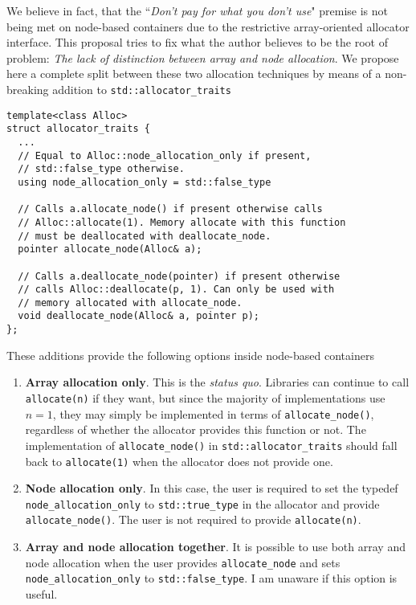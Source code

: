 \documentclass[11pt]{article}
\begin{document}
We believe in fact, that the ``{\it Don't pay for what you don't use}" premise
is not being met on node-based containers due to the restrictive
array-oriented allocator interface. This proposal tries to fix what the author
believes to be the root of problem: {\it The lack of distinction between array
and node allocation}.  We propose here a complete split between these two
allocation techniques by means of a non-breaking addition to
\texttt{std::allocator\_traits}
\medskip
\begin{lstlisting}
template<class Alloc>
struct allocator_traits {
  ...
  // Equal to Alloc::node_allocation_only if present,
  // std::false_type otherwise.
  using node_allocation_only = std::false_type

  // Calls a.allocate_node() if present otherwise calls
  // Alloc::allocate(1). Memory allocate with this function
  // must be deallocated with deallocate_node.
  pointer allocate_node(Alloc& a);

  // Calls a.deallocate_node(pointer) if present otherwise
  // calls Alloc::deallocate(p, 1). Can only be used with
  // memory allocated with allocate_node.
  void deallocate_node(Alloc& a, pointer p);
};
\end{lstlisting}
These additions provide the following options inside node-based
containers
\begin{enumerate}
\item {\bf Array allocation only}.
This is the {\it status quo}. Libraries can continue to call
\texttt{allocate(n)} if they want, but since the majority of implementations
use $n = 1$, they may simply be implemented in terms of
\texttt{allocate\_node()}, regardless of whether the allocator provides this
function or not. The implementation of \texttt{allocate\_node()} in
\texttt{std::allocator\_traits} should fall back to \texttt{allocate(1)} 
when the allocator does not provide one.

\item {\bf Node allocation only}.
In this case, the user is required to set the typedef \texttt{node\_allocation\_only}
to \texttt{std::true\_type} in the allocator and provide \texttt{allocate\_node()}. The user is
not required to provide \texttt{allocate(n)}.
\item {\bf Array and node allocation together}. It is possible to use
both array {and} node allocation when the user provides \texttt{allocate\_node}
and sets \texttt{node\_allocation\_only} to \texttt{std::false\_type}.
I am unaware if this option is useful.
\end{enumerate}
\end{document}
